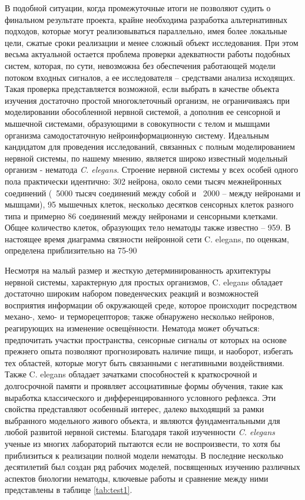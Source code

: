 В подобной ситуации, когда промежуточные итоги не позволяют судить о финальном результате проекта, крайне необходима разработка альтернативных подходов, которые могут реализовываться параллельно, имея более локальные цели, сжатые сроки реализации и менее сложный объект исследования. При этом весьма актуальной остается проблема проверки адекватности работы подобных систем, которая, по сути, невозможна без обеспечения работающей модели потоком входных сигналов, а ее исследователя – средствами анализа исходящих. Такая проверка представляется возможной, если выбрать в качестве объекта изучения достаточно простой многоклеточный организм, не ограничиваясь при моделировании обособленной нервной системой, а дополнив ее сенсорной и мышечной системами, образующими в совокупности с телом и мышцами организма самодостаточную нейроинформационную систему. Идеальным кандидатом для проведения исследований, связанных с полным моделированием нервной системы, по нашему мнению, является широко известный модельный организм - нематода \textit{C. elegans}. Строение нервной системы у всех особей одного пола практически идентично: 302 нейрона, около семи тысяч межнейронных соединений (~5000 тысяч соединений между собой и ~2000 – между нейронами и мышцами), 95 мышечных клеток, несколько десятков сенсорных клеток разного типа и примерно 86 соединений между нейронами и сенсорными клетками. Общее количество клеток, образующих тело нематоды также известно – 959. В настоящее время диаграмма связности нейронной сети C. elegans, по оценкам, определена приблизительно на 75-90%

Несмотря на малый размер и жесткую детерминированность архитектуры нервной системы, характерную для простых организмов, C. elegans обладает достаточно широким набором поведенческих реакций и возможностей восприятия информации об окружающей среде, которое происходит посредством механо-, хемо- и терморецепторов; также обнаружено несколько нейронов, реагирующих на изменение освещённости. Нематода может обучаться: предпочитать участки пространства, сенсорные сигналы от которых на основе прежнего опыта позволяют прогнозировать наличие  пищи, и наоборот, избегать тех областей, которые могут быть связанными с негативными воздействиями. Также C. elegans обладает зачатками способностей к краткосрочной и долгосрочной памяти и проявляет ассоциативные формы обучения, такие как выработка классического и дифференцированного условного рефлекса. Эти свойства представляют особенный интерес, далеко выходящий за рамки выбранного модельного живого объекта, и являются фундаментальными для любой развитой нервной системы. Благодаря такой изученности \textit{C. elegans} ученые из многих лабораторий пытаются если не воспроизвести, то хотя бы приблизиться к реализации полной модели нематоды. В последние несколько десятилетий был создан ряд рабочих моделей, посвященных изучению различных аспектов биологии нематоды, ключевые работы и сравнение между ними представлены в таблице \ref{tab:test1}.

